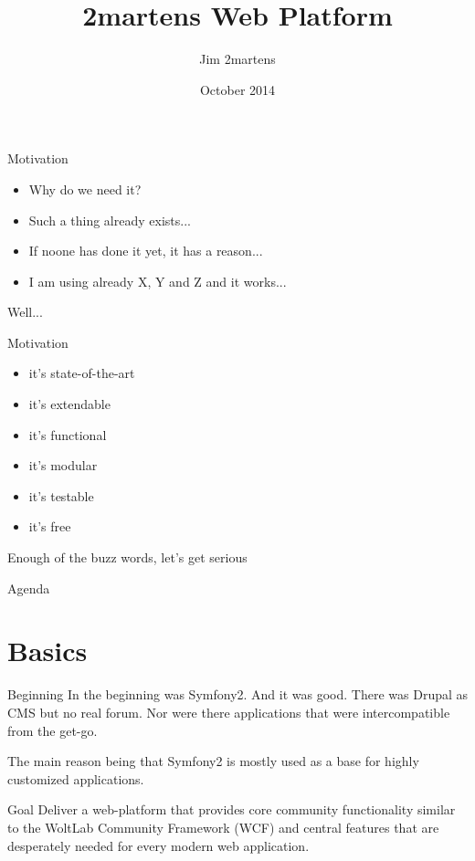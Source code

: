 \documentclass{beamer}
\begin{document}
\author{Jim 2martens}
\title{2martens Web Platform}
\date{October 2014}

	\begin{frame}
		\titlepage
	\end{frame}
	
	\begin{frame}{Motivation}
		\begin{itemize}
			\item Why do we need it?
			\item Such a thing already exists...
			\item If noone has done it yet, it has a reason...
			\item I am using already X, Y and Z and it works...
		\end{itemize}
		
		Well...
	\end{frame}
	
	\begin{frame}{Motivation}
		\begin{itemize}
			\item it's state-of-the-art
			\item it's extendable
			\item it's functional
			\item it's modular
			\item it's testable
			\item it's free
		\end{itemize}
		
		Enough of the buzz words, let's get serious
	\end{frame}	
	
	\begin{frame}{Agenda}
		\tableofcontents
	\end{frame}
	
	\section{Basics}
	\begin{frame}{Beginning}
		In the beginning was Symfony2. And it was good. There was Drupal as CMS but no real forum. Nor were there applications that were intercompatible from the get-go.
		
		The main reason being that Symfony2 is mostly used as a base for highly customized applications.
	\end{frame}
	
	\begin{frame}{Goal}
		Deliver a web-platform that provides core community functionality similar to the WoltLab Community Framework (WCF) and central features that are desperately needed for every modern web application.	
	\end{frame}
	
\end{document}

